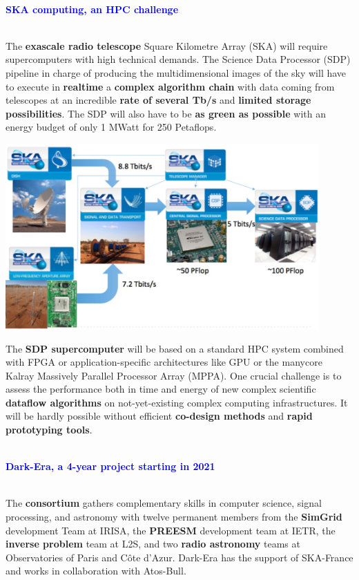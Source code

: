 \documentclass{beamer}
\renewenvironment{block}[1]{%
\begin{Sbox}%
\begin{minipage}[t]{\textwidth}
~\\
\textcolor{blue}{\quad #1}~\\
~\\%
\vspace{0.5cm}
} 
{%
\end{minipage}
\end{Sbox}\Ovalbox{\TheSbox}%
}
\begin{document}
{\begin{columns}[t]
\begin{column}{.49\linewidth}
\begin{block}{\large \textbf{SKA computing, an HPC challenge}}
        \begin{minipage}{0.95\textwidth}
The \textbf{exascale radio telescope} Square Kilometre Array (SKA) \cite{skatelescope} will require supercomputers with high technical demands. The Science Data Processor (SDP) pipeline in charge of producing the multidimensional images of the sky will have to execute in \textbf{realtime} a \textbf{complex algorithm chain} with data coming from telescopes at an incredible \textbf{rate of several Tb/s} and \textbf{limited storage possibilities}. The SDP will also have to be \textbf{as green as possible} with an energy budget of only 1 MWatt for 250 Petaflops. 


\begin{center}
    \includegraphics[width=0.9\textwidth ]{pipeline} %
    \end{center}

The \textbf{SDP supercomputer} will be based on a standard HPC system combined with FPGA or application-specific architectures like GPU or the manycore Kalray Massively Parallel Processor Array (MPPA). One crucial challenge is to assess the performance both in time and energy of new complex scientific \textbf{dataflow algorithms} on not-yet-existing complex computing infrastructures. It will be hardly possible without efficient \textbf{co-design methods} and \textbf{rapid prototyping tools}.
\end{minipage}
\end{block}


\begin{block}{\large \textbf{Dark-Era, a 4-year project starting in 2021}}
 \begin{minipage}{0.95\textwidth}
The \textbf{consortium} gathers complementary skills in computer science, signal processing, and astronomy with twelve permanent members from the \textbf{SimGrid} \cite{casanova:hal-01017319} development Team at IRISA, the \textbf{PREESM} \cite{preesm} development team at IETR, the \textbf{inverse problem} team at L2S, and two \textbf{radio astronomy} teams at Observatories of Paris and Côte d’Azur. Dark-Era has the support of SKA-France and works in collaboration with Atos-Bull.\\


\end{minipage}
\end{block}
\end{column}
\end{columns}}
\end{document}
